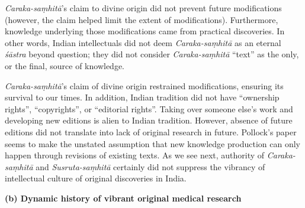 {\sl Caraka-saṃhitā}'s claim to divine origin did not prevent future modifications (however, the claim helped limit the extent of modifications).  Furthermore, knowledge underlying those modifications came from practical discoveries.  In other words, Indian intellectuals did not deem {\sl Caraka-saṃhitā} as an eternal {\sl śāstra} beyond question; they did not consider {\sl Caraka-saṃhitā} ``text'' as the only, or the final, source of knowledge.

{\sl Caraka-saṃhitā}'s claim of divine origin restrained modifications, ensuring its survival to our times. In addition, Indian tradition did not have ``ownership rights'', ``copyrights'', or ``editorial rights''.  Taking over someone else's work and developing new editions is alien to Indian tradition.  However, absence of future editions did not translate into lack of original research in future.  Pollock's paper seems to make the unstated assumption that new knowledge production can only happen through revisions of existing texts. As we see next, authority of {\sl Caraka-saṃhitā} and {\sl Susruta-saṃhitā} certainly did not suppress the vibrancy of intellectual culture of original discoveries in India.

{\bf (b) Dynamic history of vibrant original medical research}

